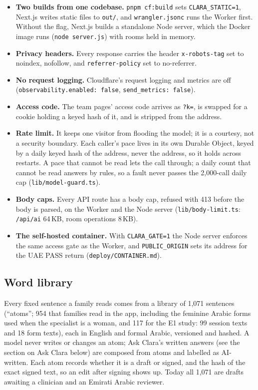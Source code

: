 \documentclass[10.5pt,a4paper]{article}
\newcommand{\code}[1]{\texttt{\small #1}}
\newcommand{\file}[1]{\leavevmode\textcolor{muted}{\texttt{\small #1}}}
\begin{document}
\begin{itemize}
  \item \textbf{Two builds from one codebase.} \code{pnpm cf:build} sets \code{CLARA\_STATIC=1}, Next.js writes static
        files to \code{out/}, and \code{wrangler.jsonc} runs the Worker first. Without the flag, Next.js builds a
        standalone Node server, which the Docker image runs (\code{node server.js}) with rooms held in memory.
  \item \textbf{Privacy headers.} Every response carries the header \code{x-robots-tag} set to noindex, nofollow, and
        \code{referrer-policy} set to no-referrer.
  \item \textbf{No request logging.} Cloudflare's request logging and metrics are off
        (\code{observability.enabled: false}, \code{send\_metrics: false}).
  \item \textbf{Access code.} The team pages' access code arrives as \code{?k=}, is swapped for a cookie holding a keyed
        hash of it, and is stripped from the address.
  \item \textbf{Rate limit.} It keeps one visitor from flooding the model; it is a courtesy, not a security boundary.
        Each caller's pace lives in its own Durable Object, keyed by a daily keyed hash of the address, never the
        address, so it holds across restarts. A pace that cannot be read lets the call through; a daily count that
        cannot be read answers by rules, so a fault never passes the 2,000-call daily cap (\file{lib/model-guard.ts}).
  \item \textbf{Body caps.} Every API route has a body cap, refused with 413 before the body is parsed, on the Worker
        and the Node server (\file{lib/body-limit.ts}: \code{/api/ai} 64\,KB, room operations 8\,KB).
  \item \textbf{The self-hosted container.} With \code{CLARA\_GATE=1} the Node server enforces the same access gate as the
        Worker, and \code{PUBLIC\_ORIGIN} sets its address for the UAE PASS return (\file{deploy/CONTAINER.md}).
\end{itemize}

\subsection{Word library}

Every fixed sentence a family reads comes from a library of 1,071 sentences (``atoms''; 954 that families read in the app, including the feminine Arabic forms used when the specialist is a woman, and 117 for the E1 study: 99 session texts and 18 form texts), each in English and formal
Arabic, versioned and hashed. A model never writes or changes an atom; Ask Clara's written answers (see the section on Ask Clara
below) are composed from atoms and labelled as AI-written. Each atom records whether it is a draft or signed, and the
hash of the exact signed text, so an edit after signing shows up. Today all 1,071 are drafts awaiting a clinician and an Emirati
Arabic reviewer.
\end{document}
